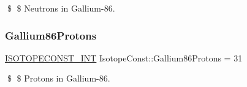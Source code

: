 \$ \$ Neutrons in Gallium-\/86. \mbox{\label{group___isotope_const-_gallium-_ga86_ga06243f09b73dc71f32ca4e54384e281e}} 
\subsubsection{\texorpdfstring{Gallium86\+Protons}{Gallium86Protons}}
{\footnotesize\ttfamily \mbox{\hyperlink{group___isotope_const-_macros_ga5f18360b3e99483a35c32d789e62621c}{I\+S\+O\+T\+O\+P\+E\+C\+O\+N\+S\+T\+\_\+\+I\+NT}} Isotope\+Const\+::\+Gallium86\+Protons = 31}

\$ \$ Protons in Gallium-\/86. 